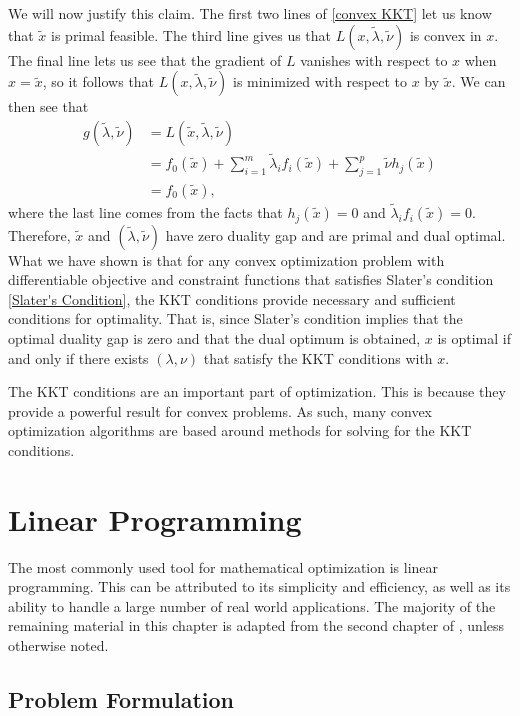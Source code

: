 	 We will now justify this claim. The first two lines of \eqref{convex KKT} let us know that $\tilde{x}$ is primal feasible. The third line gives us that $L(x,\tilde{\lambda}, \tilde{\nu})$ is convex in $x$. The final line lets us see that the gradient of $L$ vanishes with respect to $x$ when $x = \tilde{x}$, so it follows that $L(x,\tilde{\lambda}, \tilde{\nu})$ is minimized with respect to $x$ by $\tilde{x}$. We can then see that 
	 $$
	 \begin{aligned}
		 g(\tilde{\lambda},\tilde{\nu}) &= L(\tilde{x}, \tilde{\lambda}, \tilde{\nu}) \\
		 &= f_0 (\tilde{x}) + \sum_{i=1}^{m} \tilde{\lambda}_i f_i (\tilde{x}) + \sum_{j = 1}^{p} \tilde{\nu} h_j (\tilde{x}) \\
		 &= f_0 (\tilde{x}),
	 \end{aligned}
	 $$
	where the last line comes from the facts that $h_j (\tilde{x}) = 0$ and $\tilde{\lambda}_i f_i (\tilde{x}) = 0$. Therefore, $\tilde{x}$ and $(\tilde{\lambda}, \tilde{\nu})$ have zero duality gap and are primal and dual optimal. What we have shown is that for any convex optimization problem with differentiable objective and constraint functions that satisfies Slater's condition \eqref{Slater's Condition}, the KKT conditions provide necessary and sufficient conditions for optimality. That is, since Slater's condition implies that the optimal duality gap is zero and that the dual optimum is obtained, $x$ is optimal if and only if there exists $(\lambda, \nu)$ that satisfy the KKT conditions with $x$. 
	
	The KKT conditions are an important part of optimization. This is because they provide a powerful result for convex problems. As such, many convex optimization algorithms are based around methods for solving for the KKT conditions. 
	
	
	\section{Linear Programming}
	
	The most commonly used tool for mathematical optimization is linear programming. This can be attributed to its simplicity and efficiency, as well as its ability to handle a large number of real world applications. The majority of the remaining material in this chapter is adapted from the second chapter of \cite{BlekhermanGrigoriy;ParriloPabloA.;Thomas2013}, unless otherwise noted. 
	
	\subsection{Problem Formulation}

